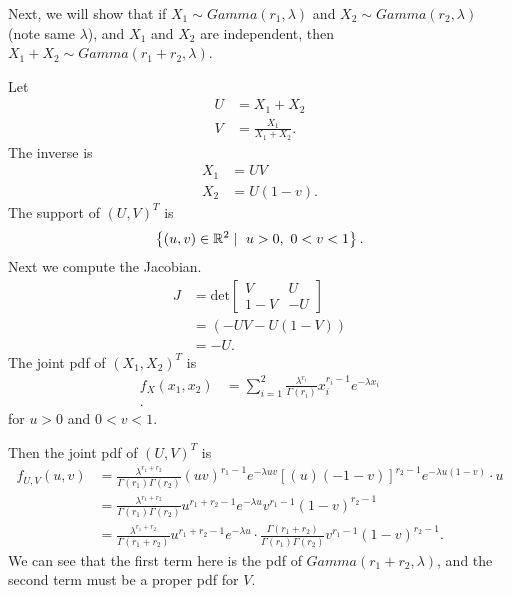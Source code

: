 
Next, we will show that if $X_1 \sim Gamma\left( r_1, \lambda \right) $ and $X_2 \sim Gamma\left( r_2, \lambda \right) $ (note same $\lambda$), and $X_1$ and $X_2$ are independent, then $X_1 + X_2 \sim Gamma\left( r_1 + r_2 , \lambda \right) $.

Let 
\begin{align*}
	U &= X_1 + X_2 \\
	V &= \frac{X_1}{X_1 + X_2}
.\end{align*}
The inverse is 
\begin{align*}
	X_1 &= UV \\
	X_2 &= U\left( 1 - v \right) 
.\end{align*}
The support of $\left( U, V \right) ^{T}$ is 
\[
	\left\{ \left( u, v \right) \in  \mathbb{R} ^2  \mid \ u > 0 ,\ 0 < v < 1 \right\} 
.\] 
Next we compute the Jacobian. 
\begin{align*}
	J &= \text{det}\begin{bmatrix} 
	V & U \\
1 - V & -U \end{bmatrix}  \\
      &= \left( -UV - U\left( 1 - V \right)  \right)  \\
      &= -U 
.\end{align*}
The joint pdf of $\left( X_1, X_2 \right) ^{T}$ is 
\begin{align*}
	f_{X}\left( x_1, x_2 \right) &= \sum_{i=1}^{2} \frac{\lambda^{r_i}}{\Gamma\left( r_i \right) }x_i^{r_i - 1}e^{-\lambda x_i} \\
.\end{align*}
for $u>0$ and $0<v<1$.

Then the joint pdf of $\left( U, V \right) ^{T}$ is 
\begin{align*}
	f_{U, V}\left( u, v \right) &= \frac{\lambda^{r_1 + r_2}}{\Gamma\left( r_1 \right) \Gamma\left( r_2 \right) }\left( uv \right) ^{r_1 - 1}e ^{-\lambda uv} \left[ \left( u \right) \left( -1-v \right)  \right] ^{r_2 - 1} e ^{-\lambda u \left( 1 - v \right) } \cdot u \\
				    &= \frac{\lambda^{r_1 + r_2}}{\Gamma\left( r_1 \right) \Gamma\left( r_2 \right) } u ^{r_1 + r_2 - 1}e ^{-\lambda u}  v  ^{r_1 - 1} \left( 1 - v \right) ^{r_2 - 1} \\
				    &= \frac{\lambda^{r_1 + r_2}}{\Gamma\left( r_1 + r_2 \right)  } u ^{r_1 + r_2 - 1}e ^{-\lambda u} \cdot \frac{\Gamma\left( r_1 + r_2 \right) }{\Gamma\left( r_1 \right) \Gamma\left( r_2 \right) }v  ^{r_1 - 1} \left( 1 - v \right) ^{r_2 - 1} 
.\end{align*}
We can see that the first term here is the pdf of $Gamma\left( r_1 + r_2, \lambda \right) $, and the second term must be a proper pdf for $V$.

